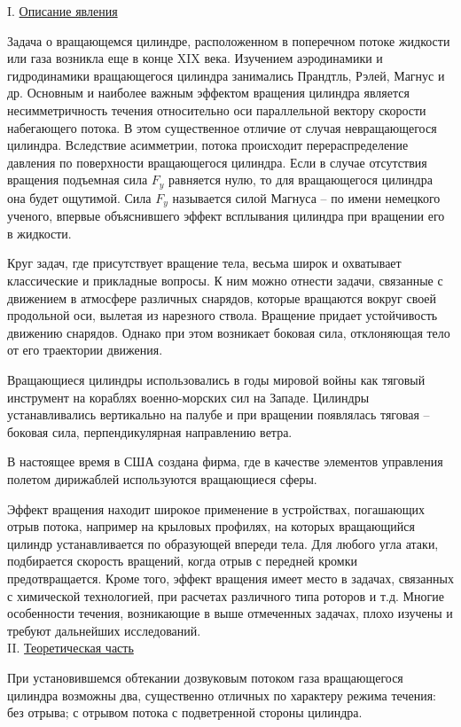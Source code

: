 \documentclass[specialist, subf, href, colorlinks=true, 14pt, final]{disser}
\theoremstyle{definition}
\newcommand{\npart}[2]{\noindent #1. \underline{#2}}
\begin{document}
\npart{I}{Описание явления}

Задача о вращающемся цилиндре, расположенном в поперечном потоке жидкости или газа возникла еще в конце XIX века. Изучением аэродинамики и гидродинамики вращающегося цилиндра занимались Прандтль, Рэлей, Магнус и др. Основным и наиболее важным эффектом вращения цилиндра является несимметричность течения относительно оси параллельной вектору скорости набегающего потока. В этом существенное отличие от случая невращающегося цилиндра. Вследствие асимметрии, потока происходит перераспределение давления по поверхности вращающегося цилиндра. Если в случае отсутствия вращения подъемная сила $F_{y}$ равняется нулю, то для вращающегося цилиндра она будет ощутимой. Сила $F_{y}$ называется силой Магнуса -- по имени немецкого ученого, впервые объяснившего эффект всплывания цилиндра при вращении его в жидкости.

Круг задач, где присутствует вращение тела, весьма широк и охватывает классические и прикладные вопросы. К ним можно отнести задачи, связанные с движением в атмосфере различных снарядов, которые вращаются вокруг своей продольной оси, вылетая из нарезного ствола. Вращение придает устойчивость движению снарядов. Однако при этом возникает боковая сила, отклоняющая тело от его траектории движения.

Вращающиеся цилиндры использовались в годы мировой войны как тяговый инструмент на кораблях военно-морских сил на Западе. Цилиндры устанавливались вертикально на палубе и при вращении появлялась тяговая -- боковая сила, перпендикулярная направлению ветра.

В настоящее время в США создана фирма, где в качестве элементов управления полетом дирижаблей используются вращающиеся сферы.

Эффект вращения находит широкое применение в устройствах, погашающих отрыв потока, например на крыловых профилях, на которых вращающийся цилиндр устанавливается по образующей впереди тела. Для любого угла атаки, подбирается скорость вращений, когда отрыв с передней кромки предотвращается. Кроме того, эффект вращения имеет место в задачах, связанных с химической технологией, при расчетах различного типа роторов и т.д. Многие особенности течения, возникающие в выше отмеченных задачах, плохо изучены и требуют дальнейших исследований.\\

\npart{II}{Теоретическая часть}

При установившемся обтекании дозвуковым потоком газа вращающегося цилиндра возможны два, существенно отличных по характеру режима течения: без отрыва; с отрывом потока с подветренной стороны цилиндра. 
\end{document}
